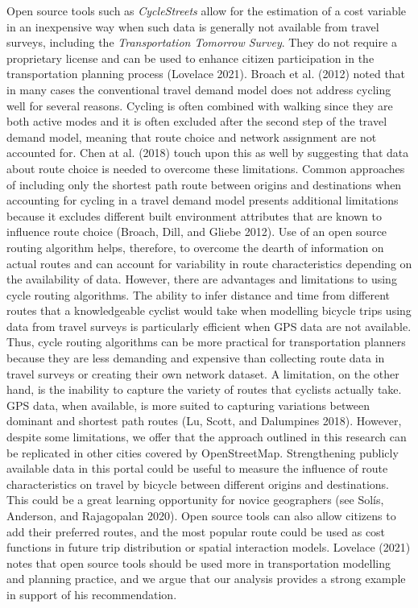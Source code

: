 \documentclass[smallextended]{svjour3}       %
\begin{document}
Open source tools such as \emph{CycleStreets} allow for the estimation
of a cost variable in an inexpensive way when such data is generally not
available from travel surveys, including the \emph{Transportation
Tomorrow Survey}. They do not require a proprietary license and can be
used to enhance citizen participation in the transportation planning
process (Lovelace 2021). Broach et al. (2012) noted that in many cases
the conventional travel demand model does not address cycling well for
several reasons. Cycling is often combined with walking since they are
both active modes and it is often excluded after the second step of the
travel demand model, meaning that route choice and network assignment
are not accounted for. Chen at al. (2018) touch upon this as well by
suggesting that data about route choice is needed to overcome these
limitations. Common approaches of including only the shortest path route
between origins and destinations when accounting for cycling in a travel
demand model presents additional limitations because it excludes
different built environment attributes that are known to influence route
choice (Broach, Dill, and Gliebe 2012). Use of an open source routing
algorithm helps, therefore, to overcome the dearth of information on
actual routes and can account for variability in route characteristics
depending on the availability of data. However, there are advantages and
limitations to using cycle routing algorithms. The ability to infer
distance and time from different routes that a knowledgeable cyclist
would take when modelling bicycle trips using data from travel surveys
is particularly efficient when GPS data are not available. Thus, cycle
routing algorithms can be more practical for transportation planners
because they are less demanding and expensive than collecting route data
in travel surveys or creating their own network dataset. A limitation,
on the other hand, is the inability to capture the variety of routes
that cyclists actually take. GPS data, when available, is more suited to
capturing variations between dominant and shortest path routes (Lu,
Scott, and Dalumpines 2018). However, despite some limitations, we offer
that the approach outlined in this research can be replicated in other
cities covered by OpenStreetMap. Strengthening publicly available data
in this portal could be useful to measure the influence of route
characteristics on travel by bicycle between different origins and
destinations. This could be a great learning opportunity for novice
geographers (see Solís, Anderson, and Rajagopalan 2020). Open source
tools can also allow citizens to add their preferred routes, and the
most popular route could be used as cost functions in future trip
distribution or spatial interaction models. Lovelace (2021) notes that
open source tools should be used more in transportation modelling and
planning practice, and we argue that our analysis provides a strong
example in support of his recommendation.
\end{document}

